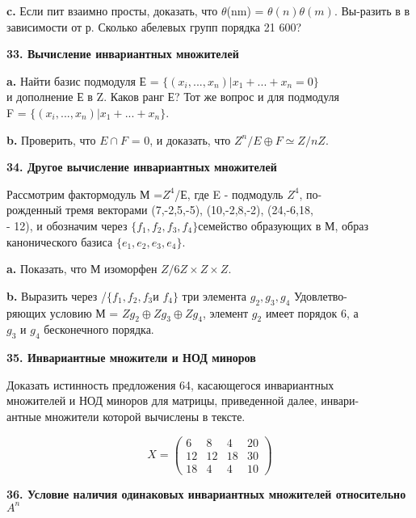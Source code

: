 {\bf c.} Если пит взаимно просты, доказать, что $\theta$(nm) = $\theta(n)\theta(m)$. 
Вы-\linebreak разить в в зависимости от р. Сколько абелевых групп порядка 21 600? 


{\noindent\bf33. Вычисление инвариантных множителей}


{\bf a.} Найти базис подмодуля Е = $\{(x_i,..., x_n) | x_1 + ... + x_n = 0\}$\\ 
и дополнение Е в Z. Каков ранг Е? Тот же вопрос и для подмодуля \\
F =  $\{(x_i,..., x_n) | x_1 + ... + x_n \}$.


{\bf b.} Проверить, что $E \cap F$ = {0}, и доказать, что $Z^n/E\oplus F\simeq Z/nZ$. 


{\noindent\bf34. Другое вычисление инвариантных множителей} 


Рассмотрим фактормодуль М =$Z^4$/Е, где E - подмодуль $Z^4$, 
по-\\рожденный тремя векторами (7,-2,5,-5), (10,-2,8,-2), (24,-6,18, \\
- 12), и обозначим через $\{f_1,f_2,f_3,f_4\}$семейство образующих в М, 
образ канонического базиса $\{e_1,e_2,e_3,e_4\}$. 


{\bf a.} Показать, что М изоморфен $Z/6Z \times Z \times Z$. 


{\bf b.} Выразить через /$\{f_1,f_2,f_3$\;и\; $f_4\}$ три элемента $g_2,g_3,g_4$
Удовлетво-\\ряющих условию М = $Zg_2\oplus Zg_3\oplus Zg_4$, элемент $g_2$ имеет порядок 6, а\\ 
$g_3$ и $g_4$ бесконечного порядка.

\pagebreak

{\noindent\bf35. Инвариантные множители и НОД миноров}

\medskip

Доказать истинность предложения 64, касающегося инвариантных\\ 
множителей и НОД миноров для матрицы, приведенной далее, 
инвари-\\антные множители которой вычислены в тексте. 



$$X =\begin{pmatrix}
6 & 8 & 4 & 20\\
12 & 12 & 18 & 30\\
18 & 4 & 4 & 10 
\end{pmatrix}$$



{\noindent\bf36. Условие наличия одинаковых инвариантных множителей 
относительно $A^n$} 

